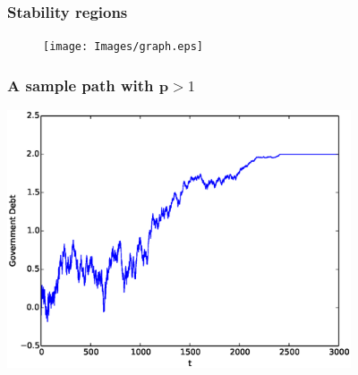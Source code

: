 \documentclass{beamer}
\begin{document}
 
\begin{frame}
   \frametitle{Stability regions}
	\begin{figure}
		\begin{center}
		\texttt{[image: Images/graph.eps]}
	\end{center}	
	\end{figure}

  \end{frame}

 
 \begin{frame}

	\frametitle{A sample path with  $\bm{p} > 1$}
	\begin{center}
	\includegraphics[width=4in]{Images/port1.eps}
	\end{center}
\end{frame}
\end{document}
